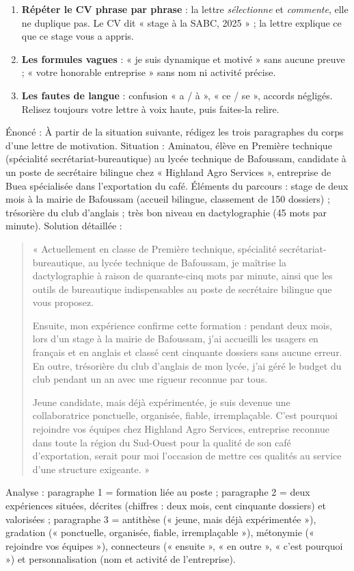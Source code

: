 \documentclass[11pt]{article}
\begin{document}
\begin{attention}
\begin{enumerate}
\item \textbf{Répéter le CV phrase par phrase} : la lettre \emph{sélectionne} et \emph{commente}, elle ne duplique pas. Le CV dit « stage à la SABC, 2025 » ; la lettre explique ce que ce stage vous a appris.
\item \textbf{Les formules vagues} : « je suis dynamique et motivé » sans aucune preuve ; « votre honorable entreprise » sans nom ni activité précise.
\item \textbf{Les fautes de langue} : confusion « a / à », « ce / se », accords négligés. Relisez toujours votre lettre à voix haute, puis faites-la relire.
\end{enumerate}
\end{attention}

\begin{exoresolu}
Énoncé : À partir de la situation suivante, rédigez les trois paragraphes du corps d'une lettre de motivation. Situation : Aminatou, élève en Première technique (spécialité secrétariat-bureautique) au lycée technique de Bafoussam, candidate à un poste de secrétaire bilingue chez « Highland Agro Services », entreprise de Buea spécialisée dans l'exportation du café. Éléments du parcours : stage de deux mois à la mairie de Bafoussam (accueil bilingue, classement de 150 dossiers) ; trésorière du club d'anglais ; très bon niveau en dactylographie (45 mots par minute).
\tcblower
Solution détaillée :
\begin{quote}
« Actuellement en classe de Première technique, spécialité secrétariat-bureautique, au lycée technique de Bafoussam, je maîtrise la dactylographie à raison de quarante-cinq mots par minute, ainsi que les outils de bureautique indispensables au poste de secrétaire bilingue que vous proposez.

Ensuite, mon expérience confirme cette formation : pendant deux mois, lors d'un stage à la mairie de Bafoussam, j'ai accueilli les usagers en français et en anglais et classé cent cinquante dossiers sans aucune erreur. En outre, trésorière du club d'anglais de mon lycée, j'ai géré le budget du club pendant un an avec une rigueur reconnue par tous.

Jeune candidate, mais déjà expérimentée, je suis devenue une collaboratrice ponctuelle, organisée, fiable, irremplaçable. C'est pourquoi rejoindre vos équipes chez Highland Agro Services, entreprise reconnue dans toute la région du Sud-Ouest pour la qualité de son café d'exportation, serait pour moi l'occasion de mettre ces qualités au service d'une structure exigeante. »
\end{quote}
Analyse : paragraphe 1 = formation liée au poste ; paragraphe 2 = deux expériences situées, décrites (chiffres : deux mois, cent cinquante dossiers) et valorisées ; paragraphe 3 = antithèse (« jeune, mais déjà expérimentée »), gradation (« ponctuelle, organisée, fiable, irremplaçable »), métonymie (« rejoindre vos équipes »), connecteurs (« ensuite », « en outre », « c'est pourquoi ») et personnalisation (nom et activité de l'entreprise).
\end{exoresolu}
\end{document}
